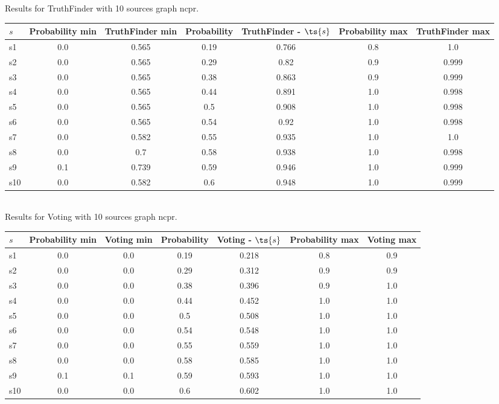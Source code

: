 \documentclass{article}
\begin{document}
\noindent Results for TruthFinder with 10 sources graph ncpr.

\noindent\begin{tabular}{|l|c|c|c|c|c|c|}
\hline
$s$& Probability min & TruthFinder min & Probability & TruthFinder - $\ts{s}$ & Probability max & TruthFinder max\\
\hline
s1 &0.0 & 0.565 & 0.19 & 0.766 & 0.8 & 1.0\\
\hline
s2 &0.0 & 0.565 & 0.29 & 0.82 & 0.9 & 0.999\\
\hline
s3 &0.0 & 0.565 & 0.38 & 0.863 & 0.9 & 0.999\\
\hline
s4 &0.0 & 0.565 & 0.44 & 0.891 & 1.0 & 0.998\\
\hline
s5 &0.0 & 0.565 & 0.5 & 0.908 & 1.0 & 0.998\\
\hline
s6 &0.0 & 0.565 & 0.54 & 0.92 & 1.0 & 0.998\\
\hline
s7 &0.0 & 0.582 & 0.55 & 0.935 & 1.0 & 1.0\\
\hline
s8 &0.0 & 0.7 & 0.58 & 0.938 & 1.0 & 0.998\\
\hline
s9 &0.1 & 0.739 & 0.59 & 0.946 & 1.0 & 0.999\\
\hline
s10 &0.0 & 0.582 & 0.6 & 0.948 & 1.0 & 0.999\\
\hline
\end{tabular}\\

\noindent Results for Voting with 10 sources graph ncpr.

\noindent\begin{tabular}{|l|c|c|c|c|c|c|}
\hline
$s$& Probability min & Voting min & Probability & Voting - $\ts{s}$ & Probability max & Voting max\\
\hline
s1 &0.0 & 0.0 & 0.19 & 0.218 & 0.8 & 0.9\\
\hline
s2 &0.0 & 0.0 & 0.29 & 0.312 & 0.9 & 0.9\\
\hline
s3 &0.0 & 0.0 & 0.38 & 0.396 & 0.9 & 1.0\\
\hline
s4 &0.0 & 0.0 & 0.44 & 0.452 & 1.0 & 1.0\\
\hline
s5 &0.0 & 0.0 & 0.5 & 0.508 & 1.0 & 1.0\\
\hline
s6 &0.0 & 0.0 & 0.54 & 0.548 & 1.0 & 1.0\\
\hline
s7 &0.0 & 0.0 & 0.55 & 0.559 & 1.0 & 1.0\\
\hline
s8 &0.0 & 0.0 & 0.58 & 0.585 & 1.0 & 1.0\\
\hline
s9 &0.1 & 0.1 & 0.59 & 0.593 & 1.0 & 1.0\\
\hline
s10 &0.0 & 0.0 & 0.6 & 0.602 & 1.0 & 1.0\\
\hline
\end{tabular}\\
\end{document}
